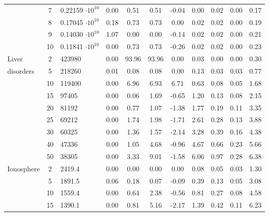 {\begin{longtable}{@{}lclcccccccc@{}}
                      & 7  & 0.22159 $\cdot 10^{10}$ & 0.00    & 0.51  & 0.51  & -0.04 & 0.00    & 0.02 & 0.00 & 0.17  \\
                      & 8  & 0.17045 $\cdot 10^{10}$ & 0.18    & 0.73  & 0.73  & 0.00  & 0.02    & 0.02 & 0.00 & 0.19  \\
                      & 9  & 0.14030 $\cdot 10^{10}$ & 1.07    & 0.00  & 0.00  & -0.14 & 0.02    & 0.02 & 0.00 & 0.21  \\
                      & 10 & 0.11841 $\cdot 10^{10}$ & 0.00    & 0.73  & 0.73  & -0.26 & 0.02    & 0.02 & 0.00 & 0.23  \\
Liver                 & 2  & 423980          & 0.00    & 93.96 & 93.96 & 0.00  & 0.03    & 0.00 & 0.00 & 0.30  \\
disorders             & 5  & 218260          & 0.01    & 0.08  & 0.08  & 0.00  & 0.13    & 0.03 & 0.03 & 0.77  \\
                      & 10 & 119400          & 0.00    & 6.96  & 6.93  & 6.71  & 0.63    & 0.08 & 0.05 & 1.68  \\
                      & 15 & 97405           & 0.00    & 0.06  & 1.69  & -0.65 & 1.20    & 0.13 & 0.08 & 2.15  \\
                      & 20 & 81192           & 0.00    & 0.77  & 1.07  & -1.38 & 1.77    & 0.19 & 0.11 & 3.35  \\
                      & 25 & 69212           & 0.00    & 1.74  & 1.98  & -1.71 & 2.61    & 0.28 & 0.13 & 3.88  \\
                      & 30 & 60325           & 0.00    & 1.36  & 1.57  & -2.14 & 3.28    & 0.39 & 0.16 & 4.38  \\
                      & 40 & 47336           & 0.00    & 1.05  & 4.68  & -0.96 & 4.67    & 0.66 & 0.23 & 5.66  \\
                      & 50 & 38305           & 0.00    & 3.33  & 9.01  & -1.58 & 6.06    & 0.97 & 0.28 & 6.38  \\
Ionosphere            & 2  & 2419.4          & 0.00    & 0.00  & 0.00  & 0.00  & 0.08    & 0.05 & 0.03 & 1.30  \\
                      & 5  & 1891.5          & 0.06    & 0.18  & 0.07  & -0.09 & 0.39    & 0.13 & 0.05 & 3.08  \\
                      & 10 & 1559.4          & 0.00    & 0.64  & 2.38  & -0.56 & 0.81    & 0.27 & 0.08 & 4.58  \\
                      & 15 & 1390.1          & 0.00    & 0.81  & 5.16  & -2.17 & 1.39    & 0.42 & 0.11 & 6.23  \\

\end{longtable}}
